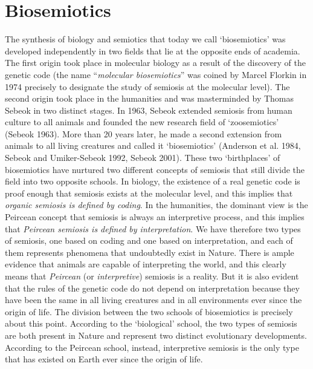 \documentclass[12pt]{article}
\begin{document}
\section{Biosemiotics}
The synthesis of biology and semiotics that today we call `biosemiotics' was developed independently in two fields that lie at the opposite ends of academia. The first origin took place in molecular biology as a result of the discovery of the genetic code (the name ``\textit{molecular biosemiotics}'' was coined by Marcel Florkin in 1974 precisely to designate the study of semiosis at the molecular level). The second origin took place in the humanities and was masterminded by Thomas Sebeok in two distinct stages. In 1963, Sebeok extended semiosis from human culture to all animals and founded the new research field of `zoosemiotics' (Sebeok 1963). More than 20 years later, he made a second extension from animals to all living creatures and called it `biosemiotics' (Anderson et al. 1984, Sebeok and Umiker-Sebeok 1992, Sebeok 2001). These two `birthplaces' of biosemiotics have nurtured two different concepts of semiosis that still divide the field into two opposite schools. In biology, the existence of a real genetic code is proof enough that semiosis exists at the molecular level, and this implies that \textit{organic semiosis is defined by coding}. In the humanities, the dominant view is the Peircean concept that semiosis is always an interpretive process, and this implies that \textit{Peircean semiosis is defined by interpretation}. We have therefore two types of semiosis, one based on coding and one based on interpretation, and each of them represents phenomena that undoubtedly exist in Nature. There is ample evidence that animals are capable of interpreting the world, and this clearly means that \textit{Peircean} (or \textit{interpretive}) semiosis is a reality. But it is also evident that the rules of the genetic code do not depend on interpretation because they have been the same in all living creatures and in all environments ever since the origin of life. The division between the two schools of biosemiotics is precisely about this point. According to the `biological' school, the two types of semiosis are both present in Nature and represent two distinct evolutionary developments. According to the Peircean school, instead, interpretive semiosis is the only type that has existed on Earth ever since the origin of life. 
\end{document}

